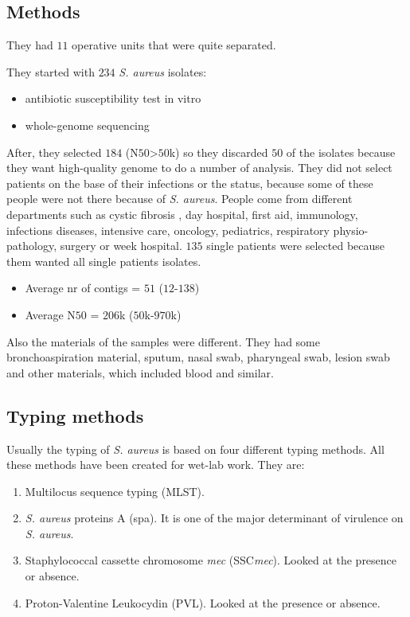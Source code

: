 \subsection{Methods}

They had $11$ operative units that were quite separated. 

They started with $234$ \emph{S. aureus} isolates:

\begin{itemize}
    \item antibiotic susceptibility test in vitro
    \item whole-genome sequencing
\end{itemize}

After, they selected $184$ (N$50$>$50$k) so they discarded $50$ of the isolates because they want high-quality genome to do a number of analysis.
They did not select patients on the base of their infections or the status, because some of these people were not there because of \emph{S. aureus}.
People come from different departments such as cystic fibrosis , day hospital, first aid,  immunology, infections diseases, intensive care, oncology, pediatrics, respiratory physio-pathology, surgery or week hospital. 
$135$ single patients were selected because them wanted all single patients isolates. 

\begin{itemize}
    \item Average nr of contigs = $51$ ($12$-$138$)
    \item Average N$50$ = $206$k ($50$k-$970$k)
\end{itemize}

Also the materials of the samples were different. They had some bronchoaspiration material, sputum, nasal swab, pharyngeal swab, lesion swab and other materials, which included blood and similar.


\subsection{Typing methods}

Usually the typing of \emph{S. aureus} is based on four different typing methods. All these methods have been created for wet-lab work. They are:

\begin{enumerate}
    \item Multilocus sequence typing (MLST).
    \item \emph{S. aureus} proteins A (spa). It is one of the major determinant of virulence on \emph{S. aureus}.
    \item Staphylococcal cassette chromosome \emph{mec} (SSC\emph{mec}). Looked at the presence or absence.
    \item Proton-Valentine Leukocydin (PVL). Looked at the presence or absence.
\end{enumerate}

